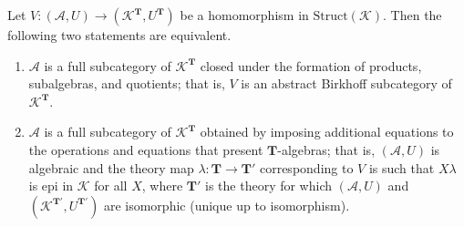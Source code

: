 Let $V : (\mathcal{A}, U) \longrightarrow (\mathcal{K}^{\mathbf{T}}, U^{\mathbf{T}})$ be a homomorphism in $\mathrm{Struct}(\mathcal{K})$. Then the following two statements are equivalent.

\begin{enumerate}
\item $\mathcal{A}$ is a full subcategory of $\mathcal{K}^{\mathbf{T}}$ closed under the formation of products, subalgebras, and quotients; that is, $V$ is an abstract Birkhoff subcategory of $\mathcal{K}^{\mathbf{T}}$.
\item $\mathcal{A}$ is a full subcategory of $\mathcal{K}^{\mathbf{T}}$ obtained by imposing additional equations to the operations and equations that present $\mathbf{T}$-algebras; that is, $(\mathcal{A}, U)$ is algebraic and the theory map $\lambda : \mathbf{T} \longrightarrow \mathbf{T}'$ corresponding to $V$ is such that $X\lambda$ is epi in $\mathcal{K}$ for all $X$, where $\mathbf{T}'$ is the theory for which $(\mathcal{A}, U)$ and $(\mathcal{K}^{\mathbf{T}'}, U^{\mathbf{T}'})$ are isomorphic (unique up to isomorphism).
\end{enumerate}
